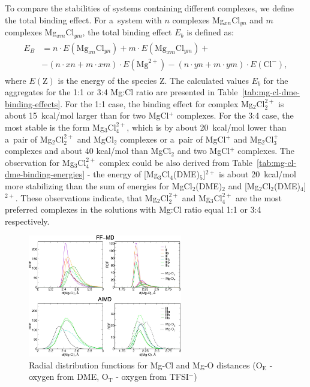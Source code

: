To compare the stabilities of systems containing different complexes, we define the total binding effect. For a~system with $n$ complexes Mg$_{xn}$Cl$_{yn}$ and $m$ complexes Mg$_{xm}$Cl$_{ym}$, the total binding effect $E_b$ is defined as:
\begin{align}
  \begin{split}
  E_B &= n\cdot E(\text{Mg}_{xn}\text{Cl}_{yn}) + m \cdot E(\text{Mg}_{xm}\text{Cl}_{ym}) +\\ 
  &- (n\cdot xn + m \cdot xm) \cdot E(\text{Mg}^{2+}) - (n\cdot yn + m \cdot ym)\cdot E(\text{Cl}^{-}),
  \end{split}
  \label{eq:mg-cl-dme-binding-effect}
\end{align}
where $E(\text{Z})$ is the energy of the species Z. The calculated values $E_b$ for the aggregates for the 1:1 or 3:4 Mg:Cl ratio are presented in Table~\ref{tab:mg-cl-dme-binding-effects}. For the 1:1 case, the binding effect for complex Mg$_2$Cl$_2^{2+}$  is about 15~kcal/mol larger than for two MgCl$^{+}$ complexes. For the 3:4 case, the most stable is the form Mg$_3$Cl$_4^{2+}$, which is by about 20~kcal/mol lower than a~pair of Mg$_2$Cl$_2^{2+}$ and MgCl$_2$ complexes or a~pair of MgCl$^{+}$ and Mg$_2$Cl$_3^{+}$ complexes and about 40 kcal/mol than MgCl$_2$ and two MgCl$^{+}$ complexes. The observation for Mg$_3$Cl$_4^{2+}$ complex could be also derived from Table~\ref{tab:mg-cl-dme-binding-energies} - the energy of {[}Mg$_3$Cl$_4$(DME)$_5${]}$^{2+}$ is about 20~kcal/mol more stabilizing than the sum of energies for MgCl$_2$(DME)$_2$ and {[}Mg$_2$Cl$_2$(DME)$_4${]}$^{2+}$. These observations indicate, that Mg$_2$Cl$_2^{2+}$ and Mg$_3$Cl$_4^{2+}$ are the most preferred complexes in the solutions with Mg:Cl ratio equal 1:1 or 3:4 respectively.

\begin{figure}[ht]
    \centering
    \includegraphics[width=0.6\textwidth]{img/3-structural-data-from-md-simulations/3-mg-cl-dme/rdf-mg-cl-o.png}
    \caption{Radial distribution functions for Mg-Cl and Mg-O distances (O$_{\text{E}}$ - oxygen from DME, O$_{\text{T}}$ - oxygen from TFSI$^{-}$)}
    \label{fig:mg-cl-dme-rdf-mg-cl-o}
\end{figure}

